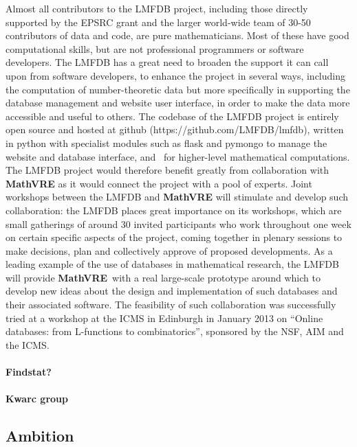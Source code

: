 \documentclass[a4paper,11pt]{article}
\newcommand{\XX}{\textbf{MathVRE}\xspace}
\newcommand{\TheProject}{\XX}
\begin{document}
Almost all contributors to the LMFDB project, including those directly
supported by the EPSRC grant and the larger world-wide team of 30-50
contributors of data and code, are pure mathematicians.  Most of these
have good computational skills, but are not professional programmers
or software developers.  The LMFDB has a great need to broaden the
support it can call upon from software developers, to enhance the
project in several ways, including the computation of number-theoretic
data but more specifically in supporting the database management and
website user interface, in order to make the data more accessible and
useful to others.  The codebase of the LMFDB project is entirely open
source and hosted at github (https://github.com/LMFDB/lmfdb), written
in python with specialist modules such as flask and pymongo to manage
the website and database interface, and \Sage\ for higher-level
mathematical computations.  The LMFDB project would therefore benefit
greatly from collaboration with \TheProject as it would connect the
project with a pool of experts.  Joint workshops between the LMFDB and
\TheProject will stimulate and develop such collaboration: the LMFDB
places great importance on its workshops, which are small gatherings
of around 30 invited participants who work throughout one week on
certain specific aspects of the project, coming together in plenary
sessions to make decisions, plan and collectively approve of proposed
developments.  As a leading example of the use of databases in
mathematical research, the LMFDB will provide \TheProject\ with a real
large-scale prototype around which to develop new ideas about the
design and implementation of such databases and their associated
software.  The feasibility of such collaboration was successfully
tried at a workshop at the ICMS in Edinburgh in January 2013 on
``Online databases: from L-functions to combinatorics'', sponsored by
the NSF, AIM and the ICMS.

\paragraph{Findstat?}

\paragraph{Kwarc group}

\draftpage

\subsection{Ambition}
\end{document}
